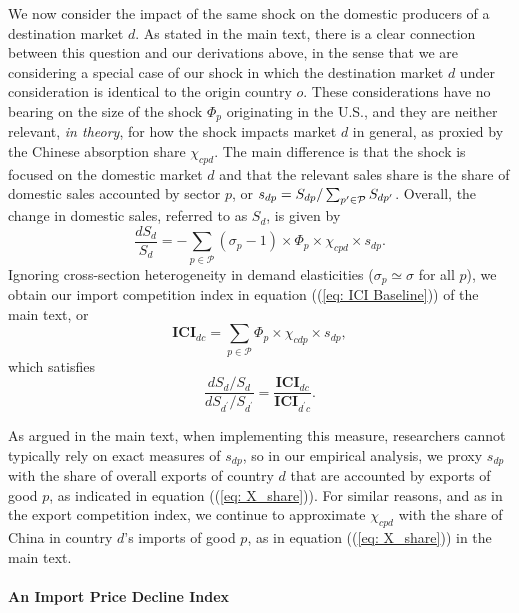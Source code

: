 \documentclass[english,12pt]{article}
\theoremstyle{definition}
\let\oldref\ref
\renewcommand{\ref}[1]{(\oldref{#1})}
\begin{document}
We now consider the impact of the same shock on the domestic producers of a
destination market $d$. As stated in the main text, there is a clear
connection between this question and our derivations above, in the sense
that we are considering a special case of our shock in which the destination
market $d$ under consideration is identical to the origin country $o$. These
considerations have no bearing on the size of the shock $\Phi _{p}$
originating in the U.S., and they are neither relevant, \emph{in theory},
for how the shock impacts market $d$ in general, as proxied by the Chinese
absorption share $\chi _{cpd}$. The main difference is that the shock is
focused on the domestic market $d$ and that the relevant sales share is the
share of domestic sales accounted by sector $p$, or $s_{dp}=S_{dp}/\sum_{p^{%
\prime }\in \mathcal{P}}S_{dp^{\prime }}$. Overall, the change in domestic
sales, referred to as $S_{d}$, is given by%
\begin{equation*}
\frac{dS_{d}}{S_{d}}=-\sum_{p\in \mathcal{P}}(\sigma _{p}-1)\times \Phi
_{p}\times \chi _{cpd}\times s_{dp}.
\end{equation*}%
Ignoring cross-section heterogeneity in demand elasticities ($\sigma
_{p}\simeq \sigma $ for all $p$), we obtain our import competition index in
equation (\ref{eq: ICI Baseline}) of the main text, or%
\begin{equation*}
\boldsymbol{ICI}_{dc}=\sum_{p\in \mathcal{P}}\Phi _{p}\times \chi
_{cdp}\times s_{dp},
\end{equation*}%
which satisfies 
\begin{equation*}
\frac{dS_{d}/S_{d}}{dS_{d^{\prime }}/S_{d^{\prime }}}=\frac{\boldsymbol{ICI}%
_{dc}}{\boldsymbol{ICI}_{d^{\prime }c}}.
\end{equation*}

As argued in the main text, when implementing this measure, researchers
cannot typically rely on exact measures of $s_{dp}$, so in our empirical
analysis, we proxy $s_{dp}\,$with the share of overall exports of country $d$
that are accounted by exports of good $p$, as indicated in equation (\ref%
{eq: X_share}). For similar reasons, and as in the export competition index,
we continue to approximate $\chi _{cpd}$ with the share of China in country $%
d$'s imports of good $p$, as in equation (\ref{eq: X_share}) in the main
text.

\paragraph{An Import Price Decline Index}
\end{document}
